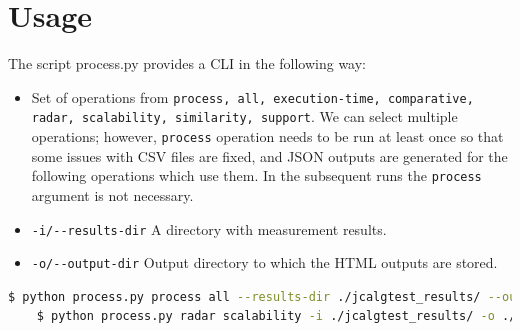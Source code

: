 \section{Usage}
The script process.py provides a CLI in the following way:

\begin{itemize}
    \item Set of operations from \texttt{process, all, execution-time, comparative, radar, scalability, similarity, support}. We can select multiple operations; however, \texttt{process} operation needs to be run at least once so that some issues with CSV files are fixed, and JSON outputs are generated for the following operations which use them. In the subsequent runs the \texttt{process} argument is not necessary.
    \item \texttt{-i/-{}-results-dir} A directory with measurement results.
    \item \texttt{-o/-{}-output-dir} Output directory to which the HTML outputs are stored.
\end{itemize}

\begin{lstlisting}[language=bash]
    $ python process.py process all --results-dir ./jcalgtest_results/ --output-dir ./jcalgtest_results/javacard/web
    $ python process.py radar scalability -i ./jcalgtest_results/ -o ./jcalgtest_results/javacard/web
\end{lstlisting}

\renewcommand{\thechapter}{B}
